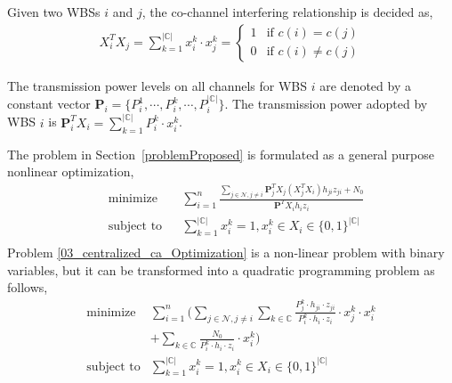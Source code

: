 \documentclass[times]{ettauth}
\theoremstyle{mytheoremstyle}
\theoremstyle{mytheoremstyle}
\theoremstyle{mytheoremstyle}
\renewcommand{\vec}[1]{\mathbf{#1}}
\begin{document}
Given two WBSs $i$ and $j$, the co-channel interfering relationship is decided as,
\begin{equation}
\begin{split}
X_i^TX_j = \sum\limits_{k=1}^{|\mathbb{C}|}x_i^k\cdot x_j^k = 
\left\{ \begin{array}{ll}
1 & \mbox{if $c(i)=c(j)$} \\
0 & \mbox{if $c(i)\neq c(j)$} 
\end{array}
\right.
\end{split}
\end{equation}

The transmission power levels on all channels for WBS $i$ are denoted by a constant vector $\vec{P}_i = \{P_i^1,\cdots, P_i^k,\cdots, P_i^{|\mathbb{C}|}\}$. 
The transmission power adopted by WBS $i$ is $\vec{P}_i^TX_i = \sum\limits_{k=1}^{|\mathbb{C}|}P_{i}^k\cdot x_i^k$.


The problem in Section~\ref{problemProposed} is formulated as a general purpose nonlinear optimization,
	\begin{equation}
\label{03_centralized_ca_Optimization}
		\begin{aligned}
		& \underset{}{\text{minimize}}
		& & \sum\limits^{n}_{i=1} \frac{\sum\limits_{j\in\mathcal{N}, j\neq i}\vec{P}_j^TX_j(X_j^TX_i)h_{ji}z_{ji} + N_0}{\vec{P}^TX_ih_iz_i}\\
		& \text{subject to}
		& & \sum\limits_{k=1}^{|\mathbb{C}|}x_i^k=1, x_i^k\in X_i\in \{0,1\}^{|\mathbb{C}|}\\
		\end{aligned}
	\end{equation}
Problem \ref{03_centralized_ca_Optimization} is a non-linear problem with binary variables, but it can be transformed into a quadratic programming problem as follows,
	\begin{equation}
\label{QLP_2}
			\begin{aligned}
			\underset{}{\text{minimize}}
			& \sum\limits^{n}_{i=1} ( \sum\limits_{j\in\mathcal{N}, j\neq i}\sum\limits_{k\in\mathbb{C}} \frac{P_j^k\cdot h_{ji}\cdot z_{ji}}{P_i^k\cdot h_i\cdot z_i}\cdot  x_j^k\cdot x_i^k  \\
			& + \sum\limits_{k\in\mathbb{C}} \frac{N_0}{P_i^k\cdot h_i\cdot z_i}\cdot x_i^k)\\
			\text{subject to} 
			& \sum\limits_{k=1}^{|\mathbb{C}|}x_i^k=1, x_i^k\in X_i\in \{0,1\}^{|\mathbb{C}|}\\
			\end{aligned}
		\end{equation}
\end{document}
